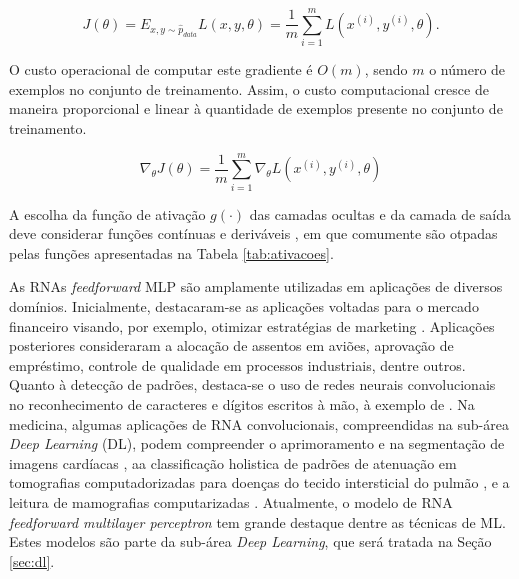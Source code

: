 \begin{equation}\label{eq:custo}
J(\theta) = E_{x,y \sim \hat{p}_{data}} L(x, y, \theta) = \frac{1}{m} \sum_{i=1}^{m} L(x^{(i)}, y^{(i)}, \theta).
\end{equation}

O custo operacional de computar este gradiente é $O(m)$, sendo $m$ o número de exemplos no conjunto de treinamento. Assim, o custo computacional cresce de maneira proporcional e linear à quantidade de exemplos presente no conjunto de treinamento.

\begin{equation}\label{eq:gradiente}
	\nabla_{\theta} J(\theta) = \frac{1}{m} \sum_{i=1}^{m} \nabla_{\theta} L(x^{(i)}, y^{(i)}, \theta)
\end{equation}

\fi

A escolha da função de ativação $g(\cdot)$ das camadas ocultas e da camada de saída deve considerar funções contínuas e deriváveis \cite{hornik1991approximation}, em que comumente são otpadas pelas funções apresentadas na Tabela  \ref{tab:ativacoes}.




As RNAs \emph{feedforward} MLP são amplamente utilizadas em aplicações de diversos domínios. Inicialmente, destacaram-se as aplicações voltadas para o mercado financeiro visando, por exemplo, otimizar estratégias de marketing \cite{widrow1994neural}. Aplicações posteriores consideraram a alocação de assentos em aviões, aprovação de empréstimo, controle de qualidade em processos industriais, dentre outros.  Quanto à detecção de padrões, destaca-se o uso de redes neurais convolucionais no reconhecimento de caracteres e dígitos escritos à mão, à exemplo de \cite{lenet}. Na medicina, algumas aplicações de RNA convolucionais, compreendidas na sub-área \emph{Deep Learning} (DL), podem compreender o aprimoramento e na segmentação de imagens cardíacas \cite{oktay2018anatomically}, aa classificação holistica de padrões de atenuação em tomografias computadorizadas para doenças do tecido intersticial do pulmão \cite{mingchen2018holistic}, e a leitura de mamografias computarizadas \cite{dubrovina2018mammography}. Atualmente, o modelo de RNA \emph{feedforward multilayer perceptron} tem grande destaque dentre as técnicas de ML. Estes modelos são parte da sub-área \emph{Deep Learning}, que será tratada na Seção \ref{sec:dl}.
